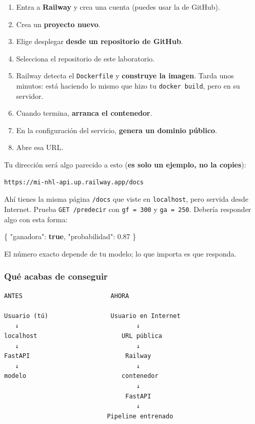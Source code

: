 \documentclass[
]{article}
\newenvironment{Shaded}{}{}
\newcommand{\DataTypeTok}[1]{\textcolor[rgb]{0.56,0.13,0.00}{#1}}
\newcommand{\FloatTok}[1]{\textcolor[rgb]{0.25,0.63,0.44}{#1}}
\newcommand{\FunctionTok}[1]{\textcolor[rgb]{0.02,0.16,0.49}{#1}}
\newcommand{\KeywordTok}[1]{\textcolor[rgb]{0.00,0.44,0.13}{\textbf{#1}}}
\providecommand{\tightlist}{%
  \setlength{\itemsep}{0pt}\setlength{\parskip}{0pt}}
\begin{document}
\begin{enumerate}
\tightlist
\item
  Entra a \textbf{Railway} y crea una cuenta (puedes usar la de GitHub).
\item
  Crea un \textbf{proyecto nuevo}.
\item
  Elige desplegar \textbf{desde un repositorio de GitHub}.
\item
  Selecciona el repositorio de este laboratorio.
\item
  Railway detecta el \texttt{Dockerfile} y \textbf{construye la imagen}.
  Tarda unos minutos: está haciendo lo mismo que hizo tu
  \texttt{docker\ build}, pero en su servidor.
\item
  Cuando termina, \textbf{arranca el contenedor}.
\item
  En la configuración del servicio, \textbf{genera un dominio público}.
\item
  Abre esa URL.
\end{enumerate}

Tu dirección será algo parecido a esto (\textbf{es solo un ejemplo, no
la copies}):

\begin{verbatim}
https://mi-nhl-api.up.railway.app/docs
\end{verbatim}

Ahí tienes la misma página \texttt{/docs} que viste en
\texttt{localhost}, pero servida desde Internet. Prueba
\texttt{GET\ /predecir} con \texttt{gf\ =\ 300} y \texttt{ga\ =\ 250}.
Debería responder algo con esta forma:

\begin{Shaded}
\begin{Highlighting}[]
\FunctionTok{\{}
  \DataTypeTok{"ganadora"}\FunctionTok{:} \KeywordTok{true}\FunctionTok{,}
  \DataTypeTok{"probabilidad"}\FunctionTok{:} \FloatTok{0.87}
\FunctionTok{\}}
\end{Highlighting}
\end{Shaded}

El número exacto depende de tu modelo; lo que importa es que responda.

\protect{}\label{53edd714}
\subsubsection{Qué acabas de
conseguir}\label{quuxe9-acabas-de-conseguir}

\begin{verbatim}
ANTES                        AHORA

Usuario (tú)                 Usuario en Internet
   ↓                                ↓
localhost                       URL pública
   ↓                                ↓
FastAPI                          Railway
   ↓                                ↓
modelo                          contenedor
                                    ↓
                                 FastAPI
                                    ↓
                            Pipeline entrenado
\end{verbatim}
\end{document}
